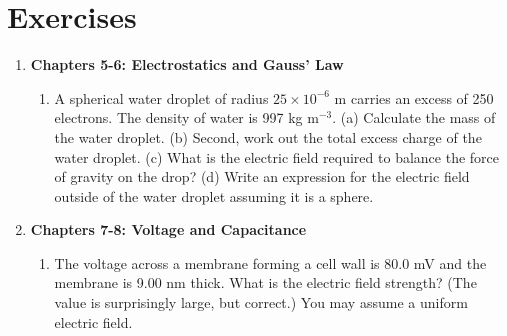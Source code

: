 \documentclass[10pt]{article}
\begin{document}
\clearpage

\section{Exercises}

\begin{enumerate}
\item \textbf{Chapters 5-6: Electrostatics and Gauss' Law}
\begin{enumerate}
\item A spherical water droplet of radius $25 \times 10^{-6}$ m carries an excess of 250 electrons.  The density of water is 997 kg m$^{-3}$.  (a) Calculate the mass of the water droplet. (b) Second, work out the total excess charge of the water droplet.  (c) What is the electric field required to balance the force of gravity on the drop? (d) Write an expression for the electric field outside of the water droplet assuming it is a sphere.  \\ \vspace{3.5cm}
\end{enumerate}
\item \textbf{Chapters 7-8: Voltage and Capacitance}
\begin{enumerate}
\item The voltage across a membrane forming a cell wall is 80.0 mV and the membrane is 9.00 nm thick. What is the electric field strength? (The value is surprisingly large, but correct.) You may assume a uniform electric field. \\ \vspace{2cm}

\end{enumerate}
\end{enumerate}
\end{document}
